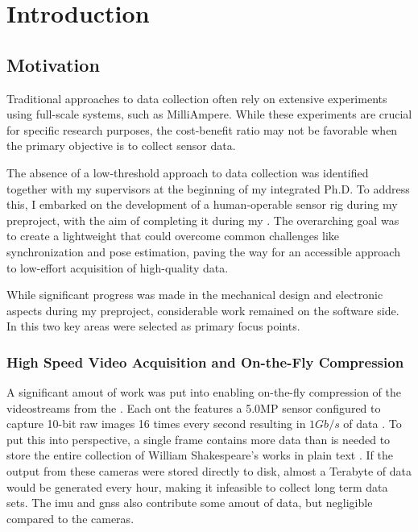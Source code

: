 \chapter{Introduction}

\section{Motivation}
Traditional approaches to data collection often rely on extensive experiments using full-scale systems, such as MilliAmpere.
While these experiments are crucial for specific research purposes, the cost-benefit ratio may not be favorable when the primary objective is to collect sensor data.

The absence of a low-threshold approach to data collection was identified together with my supervisors at the beginning of my integrated Ph.D.
To address this, I embarked on the development of a human-operable sensor rig during my preproject, with the aim of completing it during my \master.
The overarching goal was to create a lightweight \sr that could overcome common challenges like synchronization and pose estimation, paving the way for an accessible approach to low-effort acquisition of high-quality data.


While significant progress was made in the mechanical design and electronic aspects during my preproject, considerable work remained on the software side.
In this \master two key areas were selected as primary focus points.

\subsection{High Speed Video Acquisition and On-the-Fly Compression}
A significant amout of work was put into enabling on-the-fly compression of the videostreams from the \sr.
Each \cam ont the \sr features a 5.0MP sensor configured to capture 10-bit raw images 16 times every second resulting in $1Gb/s$ of data \cite{lucidvisionlabsTriton0MPPolarization}.
To put this into perspective, a single frame contains more data than is needed to store the entire collection of William Shakespeare's works in plain text \cite{projectgutenbergCompleteWorksWilliam1994}.
If the output from these cameras were stored directly to disk, almost a Terabyte of data would be generated every hour, making it infeasible to collect long term data sets.
The \gls{imu} and \gls{gnss} also contribute some amout of data, but negligible compared to the cameras.

